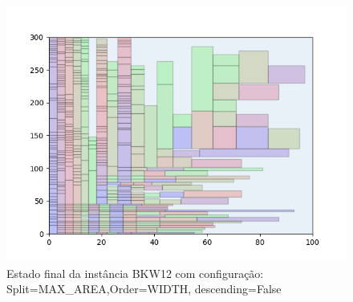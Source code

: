 \begin{figure}[H]
    \centering
    \caption[]{Estado final da instância BKW12 com configuração: Split=MAX_AREA,Order=WIDTH, descending=False}
    \label{fig:bkw12-max_area-width-false}
    \includegraphics[scale=0.5]{output/figures/bkw/bkw12/max_area/width/false/000}
\end{figure}
